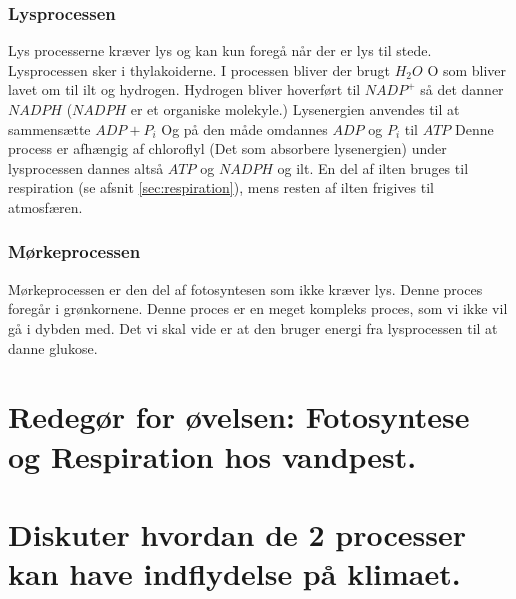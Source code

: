             \subsubsection{Lysprocessen}
                Lys processerne kræver lys og kan kun foregå når der er lys til stede. Lysprocessen sker i thylakoiderne. I processen bliver der brugt \begin{math}H_2O\end{math} O som bliver lavet om til ilt og hydrogen. Hydrogen bliver hoverført til \begin{math}NADP^+\end{math} så det danner \begin{math}NADPH\end{math} (\begin{math}NADPH\end{math} er et organiske molekyle.) 
                Lysenergien anvendes til at sammensætte \begin{math}ADP + P_i\end{math} Og på den måde omdannes \begin{math}ADP\end{math} og \begin{math}P_i\end{math} til \begin{math}ATP\end{math} Denne process er afhængig af chloroflyl (Det som absorbere lysenergien) under lysprocessen dannes altså \begin{math}ATP\end{math} og \begin{math}NADPH\end{math} og ilt. En del af ilten bruges til respiration (se afsnit \ref{sec:respiration}), mens resten af ilten frigives til atmosfæren.

            \subsubsection{Mørkeprocessen}
                Mørkeprocessen er den del af fotosyntesen som ikke kræver lys. Denne proces foregår i grønkornene. Denne proces er en meget kompleks proces, som vi ikke vil gå i dybden med. Det vi skal vide er at den bruger energi fra lysprocessen til at danne glukose.


    \section{Redegør for øvelsen: Fotosyntese og Respiration hos vandpest.}
    \section{Diskuter hvordan de 2 processer kan have indflydelse på klimaet.}